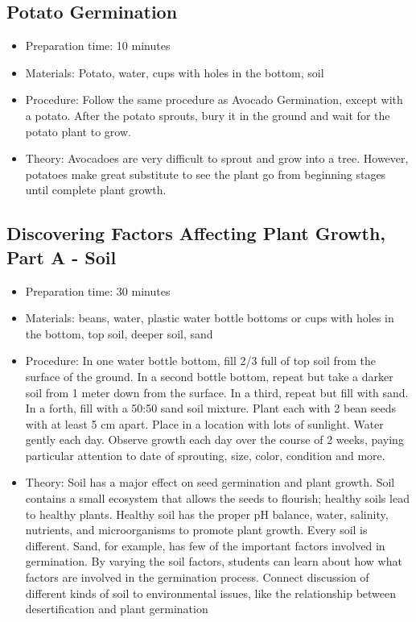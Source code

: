 \subsection{Potato Germination}
\begin{itemize}
\item{Preparation time: 10 minutes}
\item{Materials: Potato, water, cups with holes in the bottom, soil}
\item{Procedure: Follow the same procedure as Avocado Germination, except with a potato. After the potato sprouts, bury it in the ground and wait for the potato plant to grow.}
\item{Theory: Avocadoes are very difficult to sprout and grow into a tree. However, potatoes make great substitute to see the plant go from beginning stages until complete plant growth.}
\end{itemize}

\subsection{Discovering Factors Affecting Plant Growth, Part A - Soil}
\begin{itemize}
\item{Preparation time: 30 minutes}
\item{Materials: beans, water, plastic water bottle bottoms or cups with holes in the bottom, top soil, deeper soil, sand}
\item{Procedure: In one water bottle bottom, fill 2/3 full of top soil from the surface of the ground. In a second bottle bottom, repeat but take a darker soil from 1 meter down from the surface. In a third, repeat but fill with sand. In a forth, fill with a 50:50 sand soil mixture. Plant each with 2 bean seeds with at least 5 cm apart. Place in a location with lots of sunlight. Water gently each day. Observe growth each day over the course of 2 weeks, paying particular attention to date of sprouting, size, color, condition and more.}
\item{Theory: Soil has a major effect on seed germination and plant growth. Soil contains a small ecosystem that allows the seeds to flourish; healthy soils lead to healthy plants. Healthy soil has the proper pH balance, water, salinity, nutrients, and microorganisms to promote plant growth. Every soil is different. Sand, for example, has few of the important factors involved in germination. By varying the soil factors, students can learn about how what factors are involved in the germination process. Connect discussion of different kinds of soil to environmental issues, like the relationship between desertification and plant germination}
\end{itemize}

